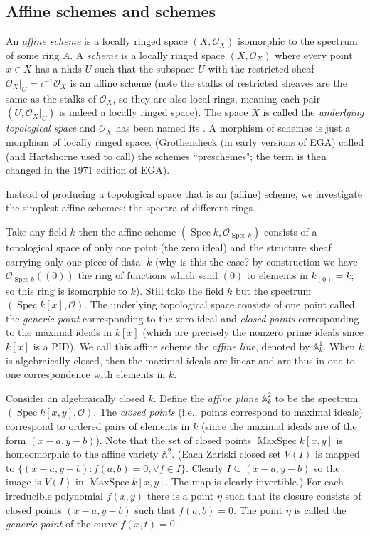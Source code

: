 \documentclass[12pt,letter]{article}
\newcommand{\Spec}[0]{\operatorname{Spec}}
\newcommand{\MaxSpec}[0]{\operatorname{MaxSpec}}
\begin{document}
	\subsection{Affine schemes and schemes}\label{ssec-scheme}
	An \textit{affine scheme} is a locally ringed space $(X,\mathscr O_X)$ isomorphic to the spectrum of some ring $A$. A \textit{scheme} is a locally ringed space $(X,\mathscr O_X)$ where every point $x\in X$ has a nhds $U$ such that the subspace $U$ with the restricted sheaf $\mathscr O_X|_U=\iota^{-1}\mathscr O_X$ is an affine scheme (note the stalks of restricted sheaves are the same as the stalks of $\mathscr O_X$, so they are also local rings, meaning each pair $(U, \mathscr O_X|_U)$ is indeed a locally ringed space). The space $X$ is called the \textit{underlying topological space} and $\mathscr O_X$ has been named its . A morphism of schemes is just a morphism of locally ringed space. (Grothendieck (in early versions of EGA) called (and Hartshorne used to call) the schemes ``preschemes"; the term is then changed in the 1971 edition of EGA).
	
	Instead of producing a topological space that is an (affine) scheme, we investigate the simplest  affine schemes: the spectra of different rings. 
	
	Take any field $k$ then the affine scheme $(\Spec k, \mathscr O_{\Spec k})$ consists of a topological space of only one point (the zero ideal) and the structure sheaf carrying only one piece of data: $k$ (why is this the case? by construction we have $\mathscr O_{\Spec k}((0))$ the ring of functions which send $(0)$ to elements in $k_{(0)}=k$; so this ring is isomorphic to $k$). Still take the field $k$ but the spectrum $(\Spec k[x], \mathscr O)$. The underlying topological space consists of one point called the \textit{generic point} corresponding to the zero ideal and \textit{closed points} corresponding to the maximal ideals in $k[x]$ (which are precisely the nonzero prime ideals since $k[x]$ is a PID). We call this affine scheme the \textit{affine line}, denoted by $\mathbb A_k^1$. When $k$ is algebraically closed, then the maximal ideals are linear and are thus in one-to-one correspondence with elements in $k$.
	
	Consider an algebraically closed $k$. Define the \textit{affine plane} $\mathbb A^2_k$ to be the spectrum $(\Spec k[x, y], \mathscr O)$. The \textit{closed points} (i.e., points correspond to maximal ideals) correspond to ordered pairs of elements in $k$ (since the maximal ideals are of the form $(x-a, y-b)$). Note that the set of closed points $\MaxSpec k[x, y]$ is homeomorphic to the affine variety $\mathbb A^2$. (Each Zariski closed set $V(I)$ is mapped to $\{(x-a, y-b):f(a, b)=0,\forall f\in I\}$. Clearly $I\subseteq (x-a, y-b)$ so the image is $V(I)$ in $\MaxSpec k[x, y]$. The map is clearly invertible.) For each irreducible polynomial $f(x, y)$ there is a point $\eta$ such that its closure consists of closed points $(x-a, y-b)$ such that $f(a, b)=0$. The point $\eta$ is called the \textit{generic point} of the curve $f(x, t)=0$.
	
\end{document}

